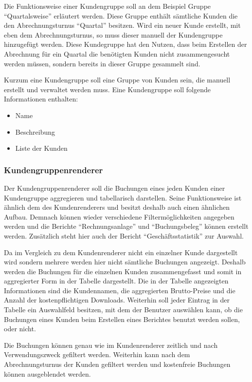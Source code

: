 Die Funktionsweise einer Kundengruppe soll an dem Beispiel Gruppe "`Quartalsweise"' erläutert werden.
Diese Gruppe enthält sämtliche Kunden die den Abrechnungsturnus "`Quartal"' besitzen. Wird ein neuer Kunde erstellt, mit eben dem Abrechnungsturnus, so muss dieser manuell der Kundengruppe hinzugefügt werden.
Diese Kundegruppe hat den Nutzen, dass beim Erstellen der Abrechnung für ein Quartal die benötigten Kunden nicht zusammengesucht werden müssen, sondern bereits in dieser Gruppe gesammelt sind.

Kurzum eine Kundengruppe soll eine Gruppe von Kunden sein, die manuell erstellt und verwaltet werden muss. Eine Kundengruppe soll folgende Informationen enthalten:
\begin{itemize}
\item Name
\item Beschreibung
\item Liste der Kunden
\end{itemize}
 
\subsubsection{Kundengruppenrenderer}
Der Kundengruppenrenderer soll die Buchungen eines jeden Kunden einer Kundengruppe aggregieren und tabellarisch darstellen.
Seine Funktionsweise ist ähnlich dem des Kundenrenderers und besitzt deshalb auch einen ähnlichen Aufbau.
Demnach können wieder verschiedene Filtermöglichkeiten angegeben werden und die Berichte \enquote{Rechnungsanlage} und \enquote{Buchungsbeleg} können erstellt werden. Zusätzlich steht hier auch der Bericht \enquote{Geschäftsstatistik} zur Auswahl.

Da im Vergleich zu dem Kundenrenderer nicht ein einzelner Kunde dargestellt wird sondern mehrere werden hier nicht sämtliche Buchungen angezeigt. Deshalb werden die Buchungen für die einzelnen Kunden zusammengefasst und somit in aggregierter Form in der Tabelle dargestellt.
Die in der Tabelle angezeigten Informationen sind die Kundennamen, die aggregierten Brutto-Preise und die Anzahl der kostenpflichtigen Downloads. Weiterhin soll jeder Eintrag in der Tabelle ein Auswahlfeld besitzen, mit dem der Benutzer auswählen kann, ob die Buchungen eines Kunden beim Erstellen eines Berichtes benutzt werden sollen, oder nicht.

Die Buchungen können genau wie im Kundenrenderer zeitlich und nach Verwendungszweck gefiltert werden. Weiterhin kann nach dem Abrechnungsturnus der Kunden gefiltert werden und kostenfreie Buchungen können ausgeblendet werden.

